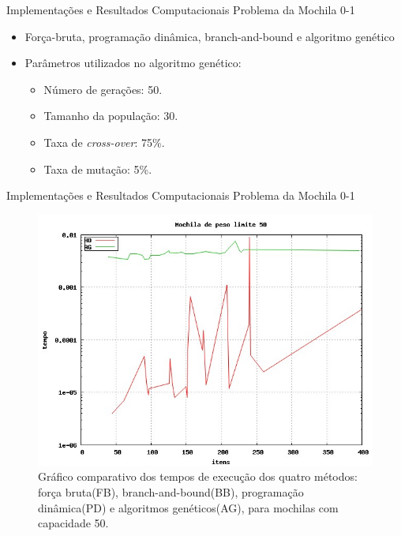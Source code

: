 \documentclass[slidestop,compress,mathserif]{beamer}
\begin{document}
\begin{frame} {Implementações e Resultados Computacionais} {Problema da Mochila 0-1}


\begin{itemize}

\item Força-bruta, programação dinâmica, branch-and-bound e algoritmo genético
\item Parâmetros utilizados no algoritmo genético:

\begin{itemize}
	\item Número de gerações: 50.
	\item Tamanho da população: 30.
	\item Taxa de \textit{cross-over}: 75\%.
	\item Taxa de mutação: 5\%.
\end{itemize}

\end{itemize}
\end{frame}


\begin{frame} {Implementações e Resultados Computacionais} {Problema da Mochila 0-1}

\scriptsize
\begin{figure}[htp]
	\centering
	\includegraphics[scale=0.3]{images/w50.jpg}
	\caption{\tiny{Gráfico comparativo dos tempos de execução dos quatro métodos: força bruta(FB), branch-and-bound(BB), programação dinâmica(PD) e algoritmos genéticos(AG), para mochilas com capacidade 50.}}
\end{figure}

\end{frame}
\end{document}
